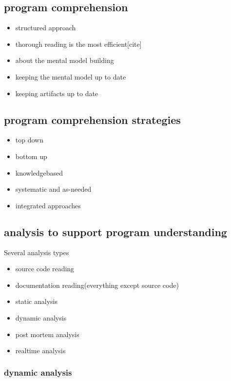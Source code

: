 \subsection{program comprehension}

\begin{itemize}
\item structured approach
\item thorough reading is the most efficient[cite]
\item about the mental model building
\item keeping the mental model up to date
\item keeping artifacts up to date
\end{itemize}

\subsection{program comprehension strategies}

\begin{itemize}
\item top down
\item bottom up
\item knowledgebased
\item systematic and as-needed
\item integrated approaches
\end{itemize}

\subsection{analysis to support program understanding}

Several analysis types
\begin{itemize}
\item source code reading
\item documentation reading(everything except source code)
\item static analysis
\item dynamic analysis
\item post mortem analysis
\item realtime analysis
\end{itemize}

\subsubsection{dynamic analysis}

